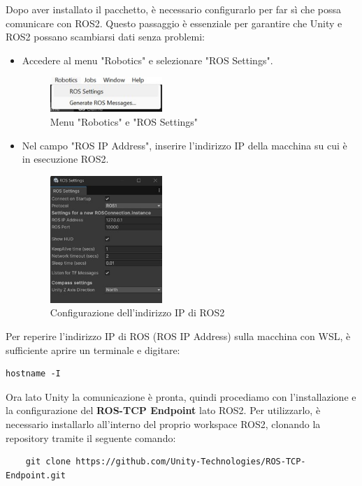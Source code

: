 \documentclass[11pt]{report}
\begin{document}
Dopo aver installato il pacchetto, è necessario configurarlo per far sì che possa comunicare con ROS2. Questo passaggio è essenziale per garantire che Unity e ROS2 possano scambiarsi dati senza problemi:


\begin{itemize}
    \item Accedere al menu "Robotics" e selezionare "ROS Settings".
    \begin{figure}[H]
        \centering
        \includegraphics[width=0.4\textwidth]{images/rostcp2.jpg}
        \caption{Menu "Robotics" e "ROS Settings"}
        \label{fig:rostcp2}
    \end{figure}
    
    \item Nel campo "ROS IP Address", inserire l'indirizzo IP della macchina su cui è in esecuzione ROS2.
    \begin{figure}[H]
        \centering
        \includegraphics[width=0.4\textwidth]{images/rostcp4.jpg}
        \caption{Configurazione dell'indirizzo IP di ROS2}
        \label{fig:rostcp4}
    \end{figure}
\end{itemize}

Per reperire l'indirizzo IP di ROS (ROS IP Address) sulla macchina con WSL, è sufficiente aprire un terminale e digitare:

\begin{verbatim}
hostname -I
\end{verbatim}

Ora lato Unity la comunicazione è pronta, quindi procediamo con l'installazione e la configurazione del \textbf{ROS-TCP Endpoint} lato ROS2.
Per utilizzarlo, è necessario installarlo all'interno del proprio workspace ROS2, clonando la repository tramite il seguente comando: \cite{Repository-ROS-TCP-Endpoint}
\begin{verbatim}
    git clone https://github.com/Unity-Technologies/ROS-TCP-Endpoint.git
\end{verbatim}
\end{document}
